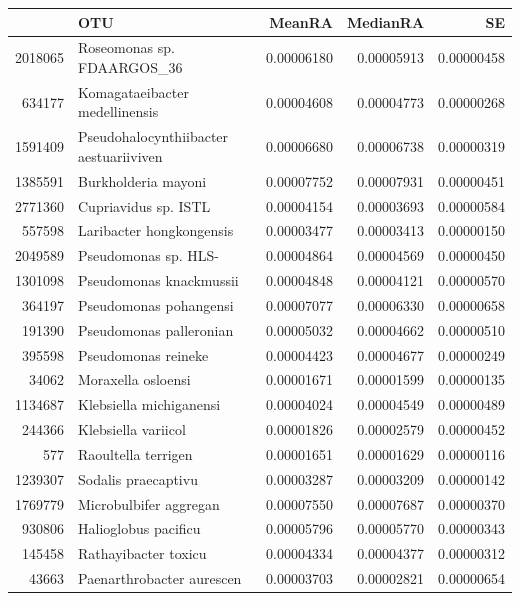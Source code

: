 \begin{table}[ht]
\centering
\begin{tabular}{rlrrr}
  \hline
 & OTU & MeanRA & MedianRA & SE \\ 
  \hline
2018065 & Roseomonas sp. FDAARGOS\_36 & 0.00006180 & 0.00005913 & 0.00000458 \\ 
  634177 & Komagataeibacter medellinensis & 0.00004608 & 0.00004773 & 0.00000268 \\ 
  1591409 & Pseudohalocynthiibacter aestuariiviven & 0.00006680 & 0.00006738 & 0.00000319 \\ 
  1385591 & Burkholderia mayoni & 0.00007752 & 0.00007931 & 0.00000451 \\ 
  2771360 & Cupriavidus sp. ISTL & 0.00004154 & 0.00003693 & 0.00000584 \\ 
  557598 & Laribacter hongkongensis & 0.00003477 & 0.00003413 & 0.00000150 \\ 
  2049589 & Pseudomonas sp. HLS- & 0.00004864 & 0.00004569 & 0.00000450 \\ 
  1301098 & Pseudomonas knackmussii & 0.00004848 & 0.00004121 & 0.00000570 \\ 
  364197 & Pseudomonas pohangensi & 0.00007077 & 0.00006330 & 0.00000658 \\ 
  191390 & Pseudomonas palleronian & 0.00005032 & 0.00004662 & 0.00000510 \\ 
  395598 & Pseudomonas reineke & 0.00004423 & 0.00004677 & 0.00000249 \\ 
  34062 & Moraxella osloensi & 0.00001671 & 0.00001599 & 0.00000135 \\ 
  1134687 & Klebsiella michiganensi & 0.00004024 & 0.00004549 & 0.00000489 \\ 
  244366 & Klebsiella variicol & 0.00001826 & 0.00002579 & 0.00000452 \\ 
  577 & Raoultella terrigen & 0.00001651 & 0.00001629 & 0.00000116 \\ 
  1239307 & Sodalis praecaptivu & 0.00003287 & 0.00003209 & 0.00000142 \\ 
  1769779 & Microbulbifer aggregan & 0.00007550 & 0.00007687 & 0.00000370 \\ 
  930806 & Halioglobus pacificu & 0.00005796 & 0.00005770 & 0.00000343 \\ 
  145458 & Rathayibacter toxicu & 0.00004334 & 0.00004377 & 0.00000312 \\ 
  43663 & Paenarthrobacter aurescen & 0.00003703 & 0.00002821 & 0.00000654 \\ 

\end{tabular}
\end{table}
